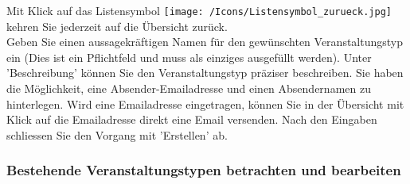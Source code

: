 Mit Klick auf das Listensymbol \texttt{[image: /Icons/Listensymbol\_zurueck.jpg]}  kehren Sie jederzeit auf die Übersicht zurück.\\
Geben Sie einen aussagekräftigen Namen  für den gewünschten Veranstaltungstyp ein (Dies ist ein Pflichtfeld und muss als einziges ausgefüllt werden). Unter 'Beschreibung'  können Sie den Veranstaltungstyp präziser beschreiben. Sie haben die Möglichkeit, eine Absender-Emailadresse  und einen Absendernamen  zu hinterlegen. Wird eine Emailadresse eingetragen, können Sie in der Übersicht mit Klick auf die Emailadresse direkt eine Email versenden. Nach den Eingaben schliessen Sie den Vorgang mit 'Erstellen'  ab.

\subsubsection{Bestehende Veranstaltungstypen betrachten und bearbeiten}

